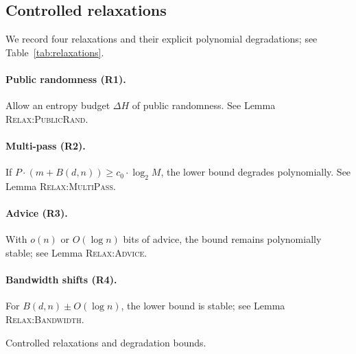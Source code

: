 \subsection{Controlled relaxations}
We record four relaxations and their explicit polynomial degradations; see Table~\ref{tab:relaxations}.

\paragraph{Public randomness (R1).}
Allow an entropy budget $\Delta H$ of public randomness. See Lemma \textsc{Relax:PublicRand}.

\paragraph{Multi-pass (R2).}
If $P\cdot(m+B(d,n)) \ge c_0\cdot \log_{2} M$, the lower bound degrades polynomially. See Lemma \textsc{Relax:MultiPass}.

\paragraph{Advice (R3).}
With $o(n)$ or $O(\log n)$ bits of advice, the bound remains polynomially stable; see Lemma \textsc{Relax:Advice}.

\paragraph{Bandwidth shifts (R4).}
For $B(d,n)\pm O(\log n)$, the lower bound is stable; see Lemma \textsc{Relax:Bandwidth}.

\begin{table}[t]
  \centering
  \caption{Controlled relaxations and degradation bounds.}
  \label{tab:relaxations}
  
\end{table}
